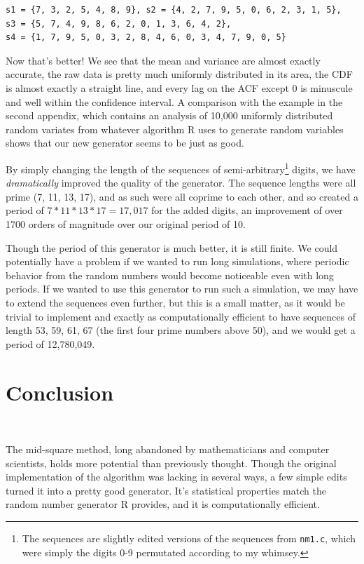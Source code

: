\documentclass[11pt]{article}
\begin{document}
\begin{verbatim}s1 = {7, 3, 2, 5, 4, 8, 9}, s2 = {4, 2, 7, 9, 5, 0, 6, 2, 3, 1, 5},
s3 = {5, 7, 4, 9, 8, 6, 2, 0, 1, 3, 6, 4, 2},
s4 = {1, 7, 9, 5, 0, 3, 2, 8, 4, 6, 0, 3, 4, 7, 9, 0, 5}\end{verbatim}

\newpage

Now that's better! We see that the mean and variance are almost exactly accurate, the raw data is pretty much uniformly distributed in its area, the CDF is almost exactly a straight line, and every lag on the ACF except 0 is minuscule and well within the confidence interval.  A comparison with the example in the second appendix, which contains an analysis of 10,000 uniformly distributed random variates from whatever algorithm R uses to generate random variables shows that our new generator seems to be just as good. 

By simply changing the length of the sequences of semi-arbitrary\footnote{
The sequences are slightly edited versions of the sequences from \texttt{nm1.c}, which were simply the digits 0-9 permutated according to my whimsey.}
digits, we have \emph{dramatically} improved the quality of the generator.  The sequence lengths were all prime (7, 11, 13, 17), and as such were all coprime to each other, and so created a period of $7*11*13*17 =  17,017$ for the added digits, an improvement of over 1700 orders of magnitude over our original period of 10.

Though the period of this generator is much better, it is still finite. We could potentially have a problem if we wanted to run long simulations, where periodic behavior from the random numbers would become noticeable even with long periods.  If we wanted to use this generator to run such a simulation, we may have to extend the sequences even further, but this is a small matter, as it would be trivial to implement and exactly as computationally efficient to have sequences of length 53, 59, 61, 67 (the first four prime numbers above 50), and we would get a period of 12,780,049.



\newpage
\section{Conclusion}

$ $

The mid-square method, long abandoned by mathematicians and computer scientists, holds more potential than previously thought.  Though the original implementation of the algorithm was lacking in several ways, a few simple edits turned it into a pretty good generator.  It's statistical properties match the random number generator R provides, and it is computationally efficient.
\end{document}
